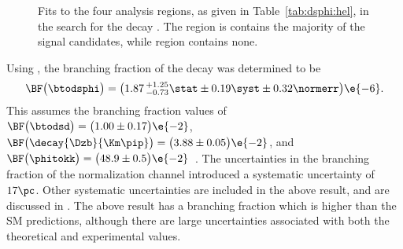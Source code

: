 \begin{figure}
  \begin{center}
    \caption[Fits to \btodsphi data]
    {\small
      Fits to the four analysis regions, as given in Table~\ref{tab:dsphi:hel}, in the search for
      the decay \btodsphi.
      The region \rA is contains the majority of the signal candidates, while region \rD contains
      none.
    }
    \label{fig:dsphi:fits}
  \end{center}
\end{figure}

Using , the branching fraction of the decay \btodsphi was determined to be
\begin{equation}
  \BF\big(\btodsphi\big) =
  \big(1.87\,^{+1.25}_{-0.73}\stat\pm0.19\syst\pm0.32\normerr\big)\e{-6}.
  \label{eq:dsphi:result}
\end{equation}
This assumes the branching fraction values of
$\BF\big(\btodsd\big)=\big(1.00\pm0.17\big)\e{-2}$,
$\BF\big(\decay{\Dzb}{\Km\pip}\big)=\big(3.88\pm0.05\big)\e{-2}$, and
$\BF\big(\phitokk\big)=\big(48.9\pm0.5\big)\e{-2}$~\cite{PDG2012}.
The uncertainties in the branching fraction of the normalization channel introduced a systematic
uncertainty of $17\pc$.
Other systematic uncertainties are included in the above result, and are discussed in
.
The above result has a branching fraction which is higher than the SM predictions, although there
are large uncertainties associated with both the theoretical and experimental values.





